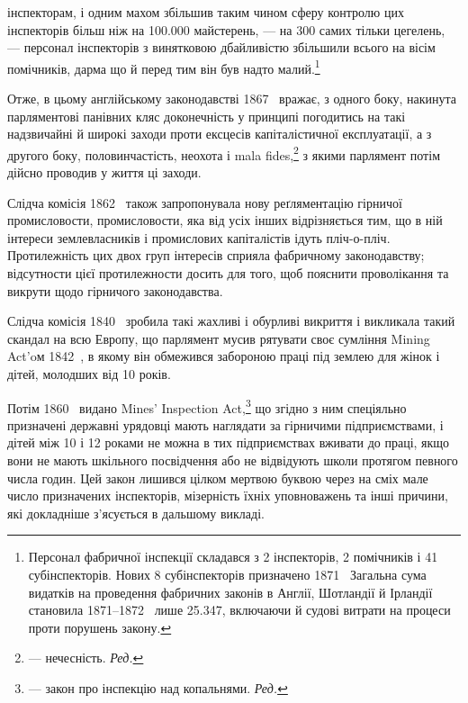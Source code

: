 \parcont{}  %
інспекторам, і одним махом збільшив таким чином сферу контролю
цих інспекторів більш ніж на \num{100.000} майстерень, — на 300 самих
тільки цегелень, — персонал інспекторів з винятковою дбайливістю
збільшили всього на вісім помічників, дарма що й перед
тим він був надто малий.\footnote{
Персонал фабричної інспекції складався з 2 інспекторів, 2 помічників
і 41 субінспекторів. Нових 8 субінспекторів призначено 1871~
Загальна сума видатків на проведення фабричних законів в Англії,
Шотландії й Ірландії становила 1871--1872~ лише \num{25.347},
включаючи й судові витрати на процеси проти порушень закону.
}

Отже, в цьому англійському законодавстві 1867~ вражає,
з одного боку, накинута парляментові панівних кляс доконечність
у принципі погодитись на такі надзвичайні й широкі заходи
проти ексцесів капіталістичної експлуатації, а з другого боку,
половинчастість, неохота і mala fides,\footnote*{
— нечесність. \emph{Ред.}
} з якими парлямент
потім дійсно проводив у життя ці заходи.

Слідча комісія 1862~ також запропонувала нову реґляментацію
гірничої промисловости, промисловости, яка від усіх інших
відрізняється тим, що в ній інтереси землевласників і промислових
капіталістів ідуть пліч-о-пліч. Протилежність цих двох
груп інтересів сприяла фабричному законодавству; відсутности
цієї протилежности досить для того, щоб пояснити проволікання
та викрути щодо гірничого законодавства.

Слідча комісія 1840~ зробила такі жахливі і обурливі викриття
і викликала такий скандал на всю Европу, що парлямент
мусив рятувати своє сумління Mining Act’oм 1842~, в якому
він обмежився забороною праці під землею для жінок і дітей,
молодших від 10 років.

Потім 1860~ видано Mines’ Inspection Act,\footnote*{
— закон про інспекцію над копальнями. \emph{Ред.}
} що згідно з ним
спеціяльно призначені державні урядовці мають наглядати за гірничими
підприємствами, і дітей між 10 і 12 роками не можна в
тих підприємствах вживати до праці, якщо вони не мають шкільного
посвідчення або не відвідують школи протягом певного
числа годин. Цей закон лишився цілком мертвою буквою через
на сміх мале число призначених інспекторів, мізерність їхніх
уповноважень та інші причини, які докладніше з’ясується в
дальшому викладі.

